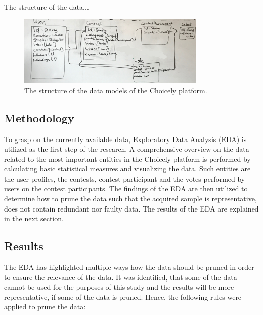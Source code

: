     The structure of the data... 
    \begin{figure}[h] 
		\begin{center}
            \includegraphics[width=0.8\textwidth]{Images/data_structure_whiteboard.jpg}
			\caption{The structure of the data models of the Choicely platform.}
			\label{choicely_data_models}
		\end{center}
    \end{figure}

\subsection{Methodology} %
    To grasp on the currently available data, Exploratory Data Analysis (EDA) is utilized as the first step of the research. A comprehensive overview on the data related to the most important entities in the Choicely platform is performed by calculating basic statistical measures and visualizing the data. Such entities are the user profiles, the contests, contest participant and the votes performed by users on the contest participants. The findings of the EDA are then utilized to determine how to prune the data such that the acquired sample is representative, does not contain redundant nor faulty data. The results of the EDA are explained in the next section. 

    

\subsection{Results}
    The EDA has highlighted multiple ways how the data should be pruned in order to ensure the relevance of the data. It was identified, that some of the data cannot be used for the purposes of this study and the results will be more representative, if some of the data is pruned. Hence, the following rules were applied to prune the data:

